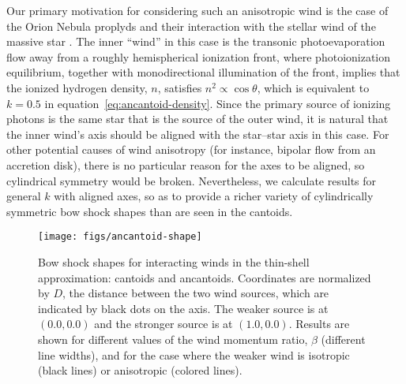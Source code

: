 \documentclass[useAMS, usenatbib, a4paper]{mnras}
\begin{document}
Our primary motivation for considering such an anisotropic wind is the
case of the Orion Nebula proplyds and their interaction with the
stellar wind of the massive star \thC{}
\citep{Garcia-Arredondo:2001a}.  The inner ``wind'' in this case is
the transonic photoevaporation flow away from a roughly hemispherical
ionization front, where photoionization equilibrium, together with
monodirectional illumination of the front, implies that the ionized
hydrogen density, \(n\), satisfies \(n^2 \propto \cos \theta\), which is
equivalent to \(k = 0.5\) in equation~\eqref{eq:ancantoid-density}.
Since the primary source of ionizing photons is the same star that is
the source of the outer wind, it is natural that the inner wind's axis
should be aligned with the star--star axis in this case.  For other
potential causes of wind anisotropy (for instance, bipolar flow from
an accretion disk), there is no particular reason for the axes to be
aligned, so cylindrical symmetry would be broken.  Nevertheless, we
calculate results for general \(k\) with aligned axes, so as to
provide a richer variety of cylindrically symmetric bow shock shapes
than are seen in the cantoids.

\begin{figure}
\texttt{[image: figs/ancantoid-shape]}
\caption{Bow shock shapes for interacting winds in the thin-shell
  approximation: cantoids and ancantoids. Coordinates are normalized
  by $D$, the distance between the two wind sources, which are
  indicated by black dots on the axis.  The weaker source is at
  \((0.0, 0.0)\) and the stronger source is at \((1.0, 0.0)\).
  Results are shown for different values of the wind momentum ratio,
  \(\beta\) (different line widths), and for the case where the weaker
  wind is isotropic (black lines) or anisotropic (colored lines).}
\label{fig:r-beta}
\end{figure}
\end{document}
